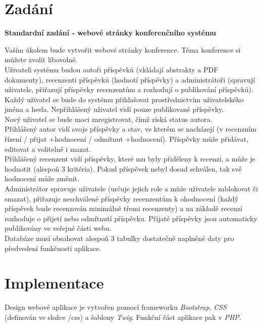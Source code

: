 \setlength{\parskip}{1em}

\chapter{Zadání}

\textbf{Standardní zadání - webové stránky konferenčního systému}

Vaším úkolem bude vytvořit webové stránky konference.  Téma konference si můžete zvolit libovolné.\\
Uživateli systému budou autoři příspěvků (vkládají abstrakty a PDF dokumenty), recenzenti příspěvků (hodnotí příspěvky) a administrátoři (spravují uživatele, přiřazují příspěvky recenzentům a rozhodují o publikování příspěvků). Každý uživatel se bude do systému přihlašovat prostřednictvím uživatelského jména a hesla. Nepřihlášený uživatel vidí pouze publikované příspěvky.\\
Nový uživatel se bude moci zaregistrovat, čímž získá status autora.\\
Přihlášený autor vidí svoje příspěvky a stav, ve kterém se nacházejí (v recenzním řízení / přijat +hodnocení / odmítnut +hodnocení). Příspěvky může přidávat, editovat a volitelně i mazat.\\
Přihlášený recenzent vidí příspěvky, které mu byly přiděleny k recenzi, a může je hodnotit (alespoň 3 kritéria). Pokud příspěvek nebyl dosud schválen, tak své hodnocení může změnit.\\
Administrátor spravuje uživatele (určuje jejich role a může uživatele zablokovat či smazat), přiřazuje neschválené příspěvky recenzentům k ohodnocení (každý příspěvek bude recenzován minimálně třemi recenzenty) a na základě recenzí rozhoduje o přijetí nebo odmítnutí příspěvku. Přijaté příspěvky jsou automaticky publikovány ve veřejné části webu.\\
Databáze musí obsahovat alespoň 3 tabulky dostatečně naplněné daty pro předvedení funkčnosti aplikace.



\chapter{Implementace}

Design webové aplikace je vytvořen pomocí frameworku \emph{Bootstrap}, \emph{CSS} (definován ve složce /css) a šablony \emph{Twig}.  Funkční část aplikace pak v \emph{PHP}.

